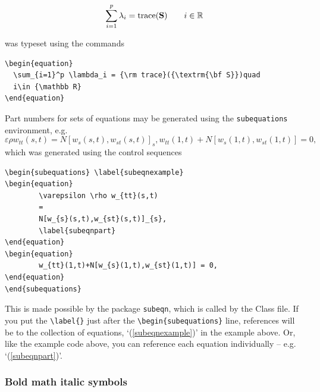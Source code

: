 \documentclass[]{cJEN2e}
\begin{document}
\begin{equation}
  \sum_{i=1}^p \lambda_i = {\rm trace}({\textrm{\bf S}})\qquad
  i\in {\mathbb R}
\end{equation}

was typeset using the commands

\begin{verbatim}
\begin{equation}
  \sum_{i=1}^p \lambda_i = {\rm trace}({\textrm{\bf S}})quad
  i\in {\mathbb R}
\end{equation}
\end{verbatim}

Part numbers for sets of equations may be generated using the
{\tt{subequations}} environment, e.g.
\begin{subequations} \label{subeqnexample}
\begin{equation}
        \varepsilon \rho w_{tt}(s,t)
        =
        N[w_{s}(s,t),w_{st}(s,t)]_{s},
        \label{subeqnpart}
\end{equation}
\begin{equation}
        w_{tt}(1,t)+N[w_{s}(1,t),w_{st}(1,t)] = 0,
\end{equation}
\end{subequations}
which was generated using the control sequences

\begin{verbatim}
\begin{subequations} \label{subeqnexample}
\begin{equation}
        \varepsilon \rho w_{tt}(s,t)
        =
        N[w_{s}(s,t),w_{st}(s,t)]_{s},
        \label{subeqnpart}
\end{equation}
\begin{equation}
        w_{tt}(1,t)+N[w_{s}(1,t),w_{st}(1,t)] = 0,
\end{equation}
\end{subequations}
\end{verbatim}
This is made possible by the package {\tt{subeqn}}, which is called
by the Class file. If you put the \verb"\label{}" just after the
\verb"\begin{subequations}" line, references will be to the
collection of equations, `(\ref{subeqnexample})' in the example
above. Or, like the example code above, you can reference each
equation individually -- e.g. `(\ref{subeqnpart})'.

\subsubsection{Bold math italic symbols}
\end{document}
